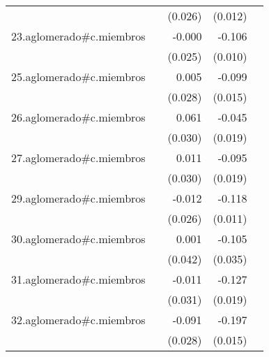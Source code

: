 {\begin{longtable}{l*{4}{D{.}{.}{-1}}}
            &                     &     (0.026)         &     (0.012)         &                     \\
\addlinespace
23.aglomerado#c.miembros&                     &      -0.000         &      -0.106\sym{***}&                     \\
            &                     &     (0.025)         &     (0.010)         &                     \\
\addlinespace
25.aglomerado#c.miembros&                     &       0.005         &      -0.099\sym{***}&                     \\
            &                     &     (0.028)         &     (0.015)         &                     \\
\addlinespace
26.aglomerado#c.miembros&                     &       0.061\sym{*}  &      -0.045\sym{*}  &                     \\
            &                     &     (0.030)         &     (0.019)         &                     \\
\addlinespace
27.aglomerado#c.miembros&                     &       0.011         &      -0.095\sym{***}&                     \\
            &                     &     (0.030)         &     (0.019)         &                     \\
\addlinespace
29.aglomerado#c.miembros&                     &      -0.012         &      -0.118\sym{***}&                     \\
            &                     &     (0.026)         &     (0.011)         &                     \\
\addlinespace
30.aglomerado#c.miembros&                     &       0.001         &      -0.105\sym{**} &                     \\
            &                     &     (0.042)         &     (0.035)         &                     \\
\addlinespace
31.aglomerado#c.miembros&                     &      -0.011         &      -0.127\sym{***}&                     \\
            &                     &     (0.031)         &     (0.019)         &                     \\
\addlinespace
32.aglomerado#c.miembros&                     &      -0.091\sym{**} &      -0.197\sym{***}&                     \\
            &                     &     (0.028)         &     (0.015)         &                     \\

\end{longtable}}
